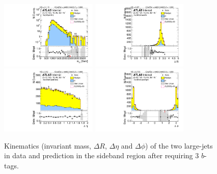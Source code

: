 \begin{figure}[htb!]
\begin{center}
\includegraphics[width=0.41\textwidth,angle=-90]{figures/boosted/Sideband/b77_ThreeTag_Sideband_mHH_l_1.pdf}
\includegraphics[width=0.41\textwidth,angle=-90]{figures/boosted/Sideband/b77_ThreeTag_Sideband_hCandDr.pdf}\\
\includegraphics[width=0.41\textwidth,angle=-90]{figures/boosted/Sideband/b77_ThreeTag_Sideband_hCandDeta.pdf}
\includegraphics[width=0.41\textwidth,angle=-90]{figures/boosted/Sideband/b77_ThreeTag_Sideband_hCandDphi.pdf}
  \caption{Kinematics (invariant mass, $\Delta R$, $\Delta \eta$ and $\Delta \phi$) of the two large-\R jets in data and prediction in the sideband region after requiring 3 $b$-tags. }
  \label{fig:boosted-3b-sideband-ak10-system}
\end{center}
\end{figure}

